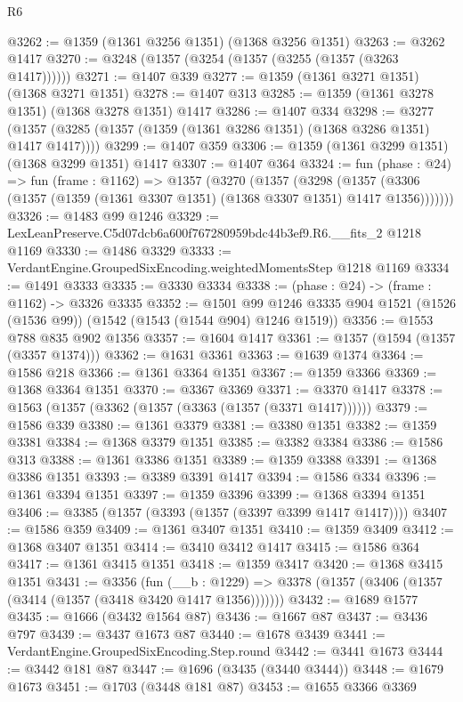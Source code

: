 \begin{lexlean}{R6}
\begin{coremodule}
@3262 := @1359 (@1361 @3256 @1351) (@1368 @3256 @1351)
@3263 := @3262 @1417
@3270 := @3248 (@1357 (@3254 (@1357 (@3255 (@1357 (@3263 @1417))))))
@3271 := @1407 @339
@3277 := @1359 (@1361 @3271 @1351) (@1368 @3271 @1351)
@3278 := @1407 @313
@3285 := @1359 (@1361 @3278 @1351) (@1368 @3278 @1351) @1417
@3286 := @1407 @334
@3298 := @3277 (@1357 (@3285 (@1357 (@1359 (@1361 @3286 @1351) (@1368 @3286 @1351) @1417 @1417))))
@3299 := @1407 @359
@3306 := @1359 (@1361 @3299 @1351) (@1368 @3299 @1351) @1417
@3307 := @1407 @364
@3324 := fun (phase : @24) =>
  fun (frame : @1162) =>
  @1357
    (@3270
      (@1357
        (@3298
          (@1357 (@3306 (@1357 (@1359 (@1361 @3307 @1351) (@1368 @3307 @1351) @1417 @1356)))))))
@3326 := @1483 @99 @1246
@3329 := LexLeanPreserve.C5d07dcb6a600f767280959bdc44b3ef9.R6.__fits_2 @1218 @1169
@3330 := @1486 @3329
@3333 := VerdantEngine.GroupedSixEncoding.weightedMomentsStep @1218 @1169
@3334 := @1491 @3333
@3335 := @3330 @3334
@3338 := (phase : @24) -> (frame : @1162) -> @3326 @3335
@3352 := @1501
    @99
    @1246
    @3335
    @904
    @1521
    (@1526 (@1536 @99))
    (@1542 (@1543 (@1544 @904) @1246 @1519))
@3356 := @1553 @788 @835 @902 @1356
@3357 := @1604 @1417
@3361 := @1357 (@1594 (@1357 (@3357 @1374)))
@3362 := @1631 @3361
@3363 := @1639 @1374
@3364 := @1586 @218
@3366 := @1361 @3364 @1351
@3367 := @1359 @3366
@3369 := @1368 @3364 @1351
@3370 := @3367 @3369
@3371 := @3370 @1417
@3378 := @1563 (@1357 (@3362 (@1357 (@3363 (@1357 (@3371 @1417))))))
@3379 := @1586 @339
@3380 := @1361 @3379
@3381 := @3380 @1351
@3382 := @1359 @3381
@3384 := @1368 @3379 @1351
@3385 := @3382 @3384
@3386 := @1586 @313
@3388 := @1361 @3386 @1351
@3389 := @1359 @3388
@3391 := @1368 @3386 @1351
@3393 := @3389 @3391 @1417
@3394 := @1586 @334
@3396 := @1361 @3394 @1351
@3397 := @1359 @3396
@3399 := @1368 @3394 @1351
@3406 := @3385 (@1357 (@3393 (@1357 (@3397 @3399 @1417 @1417))))
@3407 := @1586 @359
@3409 := @1361 @3407 @1351
@3410 := @1359 @3409
@3412 := @1368 @3407 @1351
@3414 := @3410 @3412 @1417
@3415 := @1586 @364
@3417 := @1361 @3415 @1351
@3418 := @1359 @3417
@3420 := @1368 @3415 @1351
@3431 := @3356
    (fun (__b : @1229) => @3378 (@1357 (@3406 (@1357 (@3414 (@1357 (@3418 @3420 @1417 @1356)))))))
@3432 := @1689 @1577
@3435 := @1666 (@3432 @1564 @87)
@3436 := @1667 @87
@3437 := @3436 @797
@3439 := @3437 @1673 @87
@3440 := @1678 @3439
@3441 := VerdantEngine.GroupedSixEncoding.Step.round
@3442 := @3441 @1673
@3444 := @3442 @181 @87
@3447 := @1696 (@3435 (@3440 @3444))
@3448 := @1679 @1673
@3451 := @1703 (@3448 @181 @87)
@3453 := @1655 @3366 @3369

\end{coremodule}
\end{lexlean}

